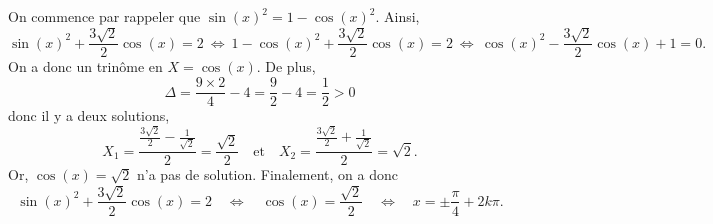 On commence par rappeler que $\sin(x)^2 = 1 -\cos(x)^2$. Ainsi,
\[ \sin(x)^2 + \frac{3\sqrt{2}}{2} \cos(x) =2 \ \Leftrightarrow \  1 -\cos(x)^2 + \frac{3\sqrt{2}}{2} \cos(x) =2 \ \Leftrightarrow \  \cos(x)^2 - \frac{3\sqrt{2}}{2} \cos(x) +1 = 0. \]
On a donc un trinôme en $X = \cos(x)$. De plus,
\[ \Delta = \frac{9 \times 2}{4} - 4 =  \frac{9}{2} - 4 = \frac{1}{2} > 0\]
donc il y a deux solutions,
\[ X_1 = \frac{\frac{3\sqrt{2}}{2} - \frac{1}{\sqrt{2}}}{2} = \frac{\sqrt{2}}{2} \quad \text{et} \quad X_2 = \frac{\frac{3\sqrt{2}}{2} + \frac{1}{\sqrt{2}}}{2} = \sqrt{2}.\]
Or, $\cos(x) = \sqrt{2}$ n'a pas de solution. Finalement, on a donc
\[ \sin(x)^2 + \frac{3\sqrt{2}}{2} \cos(x) =2 \quad \Leftrightarrow \quad \cos(x) = \frac{\sqrt{2}}{2} \quad \Leftrightarrow \quad x = \pm \frac{\pi}{4} + 2 k \pi.\]